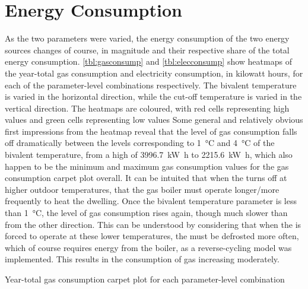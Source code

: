 \section{Energy Consumption}
As the two parameters were varied, the energy consumption of the two energy sources changes of course, in magnitude and their respective share of the total energy consumption. \cref{tbl:gasconsump} and \cref{tbl:elecconsump} show heatmaps of the year-total gas consumption and electricity consumption, in kilowatt hours, for each of the parameter-level combinations respectively. The bivalent temperature is varied in the horizontal direction, while the cut-off temperature is varied in the vertical direction. The heatmaps are coloured, with red cells representing high values and green cells representing low values Some general and relatively obvious first impressions from the heatmap reveal that the level of gas consumption falls off dramatically between the levels corresponding to \qty{1}{\celsius} and \qty{4}{\celsius} of the bivalent temperature, from a high of \qty{3996.7}{\kilo\watt\hour} to \qty{2215.6}{\kilo\watt\hour}, which also happen to be the minimum and maximum gas consumption values for the gas consumption carpet plot overall. It can be intuited that when the \HP turns off at higher outdoor temperatures, that the gas boiler must operate longer/more frequently to heat the dwelling. Once the bivalent temperature parameter is less than \qty{1}{\celsius}, the level of gas consumption rises again, though much slower than from the other direction. This can be understood by considering that when the \HP is forced to operate at these lower temperatures, the \HP must be defrosted more often, which of course requires energy from the boiler, as a reverse-cycling model was implemented. This results in the consumption of gas increasing moderately. 



\begin{table}[htb]
    \footnotesize
    \centering
    \caption{Year-total gas consumption carpet plot for each parameter-level combination}
    \label{tbl:gasconsump}
\end{table}

